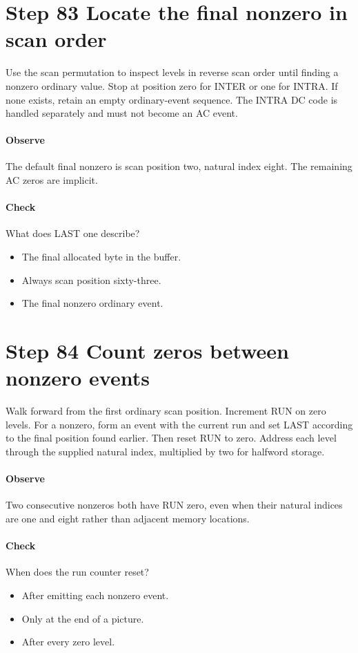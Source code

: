 \section{Step 83 Locate the final nonzero in scan order}\label{h263-coeff-s03}
Use the scan permutation to inspect levels in reverse scan order until finding
a nonzero ordinary value. Stop at position zero for INTER or one for INTRA.
If none exists, retain an empty ordinary-event sequence. The INTRA DC code is
handled separately and must not become an AC event.

\paragraph{Observe} The default final nonzero is scan position two, natural
index eight. The remaining AC zeros are implicit.
\paragraph{Check} What does LAST one describe?
\begin{itemize}
  \item[A.] The final allocated byte in the buffer.
  \item[B.] Always scan position sixty-three.
  \item[C.] The final nonzero ordinary event.
\end{itemize}

\section{Step 84 Count zeros between nonzero events}\label{h263-coeff-s04}
Walk forward from the first ordinary scan position. Increment RUN on zero levels.
For a nonzero, form an event with the current run and set LAST according to the
final position found earlier. Then reset RUN to zero. Address each level through
the supplied natural index, multiplied by two for halfword storage.

\paragraph{Observe} Two consecutive nonzeros both have RUN zero, even when their
natural indices are one and eight rather than adjacent memory locations.
\paragraph{Check} When does the run counter reset?
\begin{itemize}
  \item[A.] After emitting each nonzero event.
  \item[B.] Only at the end of a picture.
  \item[C.] After every zero level.
\end{itemize}


